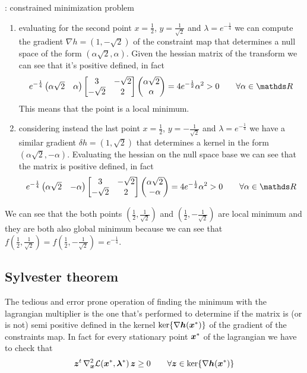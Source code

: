 \begin{example}{: constrained minimization problem}
\begin{enumerate}
			\item evaluating for the second point $x = \frac 1 2$, $y = \frac{1}{\sqrt 2}$ and $\lambda = e^{-\frac 14}$ we can compute the gradient $\nabla h = (1, - \sqrt 2)$ of the constraint map that determines a null space of the form $(\alpha \sqrt 2,\alpha)$. Given the hessian matrix of the transform we can see that it's positive defined, in fact
			\[ e^{-\frac 1 4} \begin{pmatrix}
				\alpha \sqrt 2 & \alpha
			\end{pmatrix} \begin{bmatrix}
				3 & -\sqrt 2 \\ -\sqrt 2 & 2 
			\end{bmatrix} \begin{pmatrix}
				\alpha \sqrt 2 \\ \alpha
			\end{pmatrix} = 4 e^{-\frac 12} \alpha^2 > 0 \qquad \forall \alpha \in \R \]
			This means that the point is a local minimum.
			
			\item considering instead the last point $x = \frac 1 2$, $y = - \frac{1}{\sqrt 2}$ and $\lambda = e^{-\frac 14}$ we have a similar gradient $\delta h = (1,\sqrt 2)$ that determines a kernel in the form $(\alpha \sqrt 2,-\alpha)$. Evaluating the hessian on the null space base we can see that the matrix is positive defined, in fact
			\[ e^{-\frac 1 4} \begin{pmatrix}
				\alpha \sqrt 2 & -\alpha
			\end{pmatrix} \begin{bmatrix}
				3 & -\sqrt 2 \\ -\sqrt 2 & 2 
			\end{bmatrix} \begin{pmatrix}
				\alpha \sqrt 2 \\ -\alpha
			\end{pmatrix} = 4 e^{-\frac 12} \alpha^2 > 0 \qquad \forall \alpha \in \R \]
		\end{enumerate}
		
		We can see that the both points $\left(\frac 12, \frac 1{\sqrt 2}\right)$ and $\left(\frac 12, -\frac 1{\sqrt 2}\right)$ are local minimum and they are both also global minimum because we can see that $f\left(\frac 12, \frac 1{\sqrt 2}\right) = f\left(\frac 12, - \frac 1{\sqrt 2}\right) = e^{-\frac 1 4}$.
	\end{example}
	
	\subsection{Sylvester theorem}
		The tedious and error prone operation of finding the minimum with the lagrangian multiplier is the one that's performed to determine if the matrix is (or is not) semi positive defined in the kernel $\ker\{\nabla \boldsymbol{h}(\boldsymbol{x}^*)\}$ of the gradient of the constraints map. In fact for every stationary point $\boldsymbol{x}^*$ of the lagrangian we have to check that
		\[ \boldsymbol{z}^t \, \nabla_{\boldsymbol{x}}^2 \mathcal L(\boldsymbol{x}^*,\boldsymbol{\lambda}^*) \, \boldsymbol{z} \geq 0 \qquad \forall \boldsymbol{z}\in \ker\{\nabla \boldsymbol{h}(\boldsymbol{x}^*)\} \]
		
